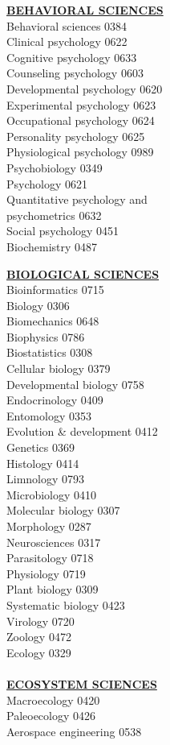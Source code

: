 \documentclass[9pt,twoside]{article}
\newcommand{\categoryheading}[1]{{\fontsize{8}{11}\selectfont \textbf{\uline{#1}}}}
\begin{document}
{\begin{multicols}{3}
\categoryheading{BEHAVIORAL SCIENCES} \\
Behavioral sciences \hfill 0384 \\
Clinical psychology \hfill 0622 \\
Cognitive psychology \hfill 0633 \\
Counseling psychology \hfill 0603 \\
Developmental psychology \hfill 0620 \\
Experimental psychology \hfill 0623 \\
Occupational psychology \hfill 0624 \\
Personality psychology \hfill 0625 \\
Physiological psychology \hfill 0989 \\
Psychobiology \hfill 0349 \\
Psychology \hfill 0621 \\
Quantitative psychology and \\
psychometrics \hfill 0632 \\
Social psychology \hfill 0451 \\
Biochemistry \hfill 0487

\categoryheading{BIOLOGICAL SCIENCES} \\
Bioinformatics \hfill 0715 \\
Biology \hfill 0306 \\
Biomechanics \hfill 0648 \\
Biophysics \hfill 0786 \\
Biostatistics \hfill 0308 \\
Cellular biology \hfill 0379 \\
Developmental biology \hfill 0758 \\
Endocrinology \hfill 0409 \\
Entomology \hfill 0353 \\
Evolution \& development \hfill 0412 \\
Genetics \hfill 0369 \\
Histology \hfill 0414 \\
Limnology \hfill 0793 \\
Microbiology \hfill 0410 \\
Molecular biology \hfill 0307 \\
Morphology \hfill 0287 \\
Neurosciences \hfill 0317 \\
Parasitology \hfill 0718 \\
Physiology \hfill 0719 \\
Plant biology \hfill 0309 \\
Systematic biology \hfill 0423 \\
Virology \hfill 0720 \\
Zoology \hfill 0472 \\
Ecology \hfill 0329 \\
\columnbreak \\
\categoryheading{ECOSYSTEM SCIENCES} \\
Macroecology \hfill 0420 \\
Paleoecology \hfill 0426 \\
Aerospace engineering \hfill 0538


\end{multicols}}
\end{document}
